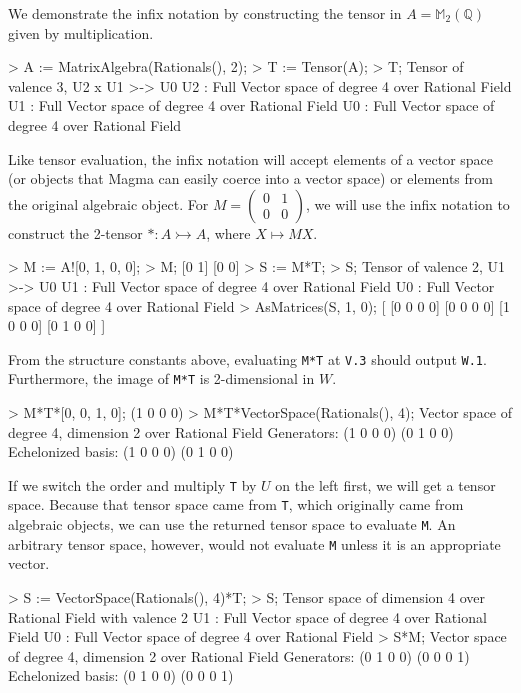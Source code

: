 \begin{example}[BimapInfix]

We demonstrate the infix notation by constructing the tensor in $A=\mathbb{M}_2(\mathbb{Q})$ given by multiplication.
\begin{code}
> A := MatrixAlgebra(Rationals(), 2);
> T := Tensor(A);
> T;
Tensor of valence 3, U2 x U1 >-> U0
U2 : Full Vector space of degree 4 over Rational Field
U1 : Full Vector space of degree 4 over Rational Field
U0 : Full Vector space of degree 4 over Rational Field
\end{code}

Like tensor evaluation, the infix notation will accept elements of a vector space (or objects that Magma can easily coerce into a vector space) or elements from the original algebraic object.
For $M=\left(\begin{smallmatrix} 0 & 1 \\ 0 & 0 \end{smallmatrix}\right)$, we will use the infix notation to construct the 2-tensor $* : A\rightarrowtail A$, where $X\mapsto MX$. 
\begin{code}
> M := A![0, 1, 0, 0];
> M;
[0 1]
[0 0]
> S := M*T;
> S;
Tensor of valence 2, U1 >-> U0
U1 : Full Vector space of degree 4 over Rational Field
U0 : Full Vector space of degree 4 over Rational Field
> AsMatrices(S, 1, 0);
[
    [0 0 0 0]
    [0 0 0 0]
    [1 0 0 0]
    [0 1 0 0]
]
\end{code}

From the structure constants above, evaluating {\tt M*T} at {\tt V.3} should output {\tt W.1}.
Furthermore, the image of {\tt M*T} is 2-dimensional in $W$.
\begin{code}
> M*T*[0, 0, 1, 0];
(1 0 0 0)
> M*T*VectorSpace(Rationals(), 4);
Vector space of degree 4, dimension 2 over Rational Field
Generators:
(1 0 0 0)
(0 1 0 0)
Echelonized basis:
(1 0 0 0)
(0 1 0 0)
\end{code}

If we switch the order and multiply {\tt T} by $U$ on the left first, we will get a tensor space.
Because that tensor space came from {\tt T}, which originally came from algebraic objects, we can use the returned tensor space to evaluate {\tt M}. 
An arbitrary tensor space, however, would not evaluate {\tt M} unless it is an appropriate vector. 
\begin{code}
> S := VectorSpace(Rationals(), 4)*T;
> S;
Tensor space of dimension 4 over Rational Field with valence 2
U1 : Full Vector space of degree 4 over Rational Field
U0 : Full Vector space of degree 4 over Rational Field
> S*M;
Vector space of degree 4, dimension 2 over Rational Field
Generators:
(0 1 0 0)
(0 0 0 1)
Echelonized basis:
(0 1 0 0)
(0 0 0 1)
\end{code}
\end{example}



